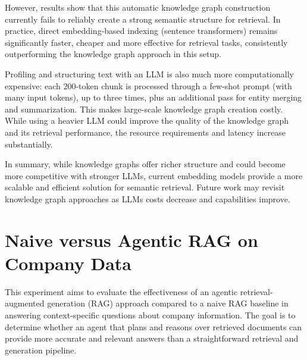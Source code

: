 However, results show that this automatic knowledge graph construction currently fails to reliably create a strong semantic structure for retrieval. In practice, direct embedding-based indexing (sentence transformers) remains significantly faster, cheaper and more effective for retrieval tasks, consistently outperforming the knowledge graph approach in this setup.

Profiling and structuring text with an LLM is also much more computationally expensive: each 200-token chunk is processed through a few-shot prompt (with many input tokens), up to three times, plus an additional pass for entity merging and summarization. This makes large-scale knowledge graph creation costly. While using a heavier LLM could improve the quality of the knowledge graph and its retrieval performance, the resource requirements and latency increase substantially.

In summary, while knowledge graphs offer richer structure and could become more competitive with stronger \glspl{LLM}, current embedding models provide a more scalable and efficient solution for semantic retrieval. Future work may revisit knowledge graph approaches as \glspl{LLM} costs decrease and capabilities improve.

\section{Naive versus Agentic RAG on Company Data}
\label{sec:expNaiveVsAgenticRAG}
This experiment aims to evaluate the effectiveness of an agentic retrieval-augmented generation (\gls{RAG}) approach compared to a naive \gls{RAG} baseline in answering context-specific questions about company information. The goal is to determine whether an agent that plans and reasons over retrieved documents can provide more accurate and relevant answers than a straightforward retrieval and generation pipeline.

